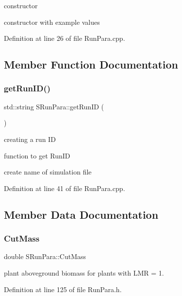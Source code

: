 constructor 

constructor with example values 

Definition at line 26 of file Run\+Para.\+cpp.



\subsection{Member Function Documentation}
\mbox{\label{struct_s_run_para_ac365498be97ac6c0cf59c57fda1039e7}} 
\subsubsection{\texorpdfstring{getRunID()}{getRunID()}}
{\footnotesize\ttfamily std\+::string S\+Run\+Para\+::get\+Run\+ID (\begin{DoxyParamCaption}{ }\end{DoxyParamCaption})}



creating a run ID 

function to get Run\+ID

create name of simulation file 

Definition at line 41 of file Run\+Para.\+cpp.



\subsection{Member Data Documentation}
\mbox{\label{struct_s_run_para_a79daf0a2044bb5df53350c0b99250ae5}} 
\subsubsection{\texorpdfstring{CutMass}{CutMass}}
{\footnotesize\ttfamily double S\+Run\+Para\+::\+Cut\+Mass}

plant aboveground biomass for plants with L\+MR = 1. 

Definition at line 125 of file Run\+Para.\+h.

\mbox{\label{struct_s_run_para_ade224470f81d526ed1959c826ba4664c}} 
